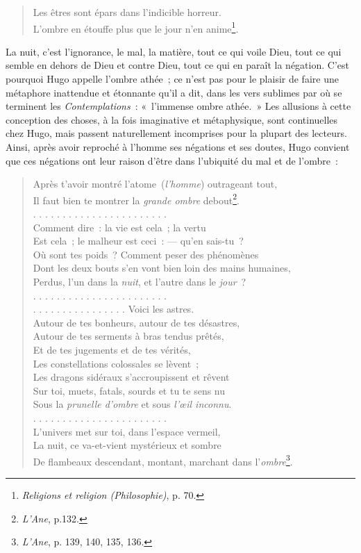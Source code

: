 \documentclass[french,twoside]{book} %
\begin{document}
\begin{verse}
Les êtres sont épars dans l’indicible horreur.\\
L’ombre en étouffe plus que le jour n’en anime\footnote{\emph{Religions et religion (Philosophie)}, p. 70.}.\\
\end{verse}

\noindent La nuit, c’est l’ignorance, le mal, la matière, tout ce qui voile Dieu, tout ce qui semble en dehors de Dieu et contre Dieu, tout ce qui en paraît la négation. C’est pourquoi Hugo appelle l’ombre athée ; ce n’est pas pour le plaisir de faire une métaphore inattendue et étonnante qu’il a dit, dans les vers sublimes par où se terminent les \emph{Contemplations} : « l’immense ombre athée. » Les allusions à cette conception des choses, à la fois imaginative et métaphysique, sont continuelles chez Hugo, mais passent naturellement incomprises pour la plupart des lecteurs. Ainsi, après avoir reproché à l’homme ses négations et ses doutes, Hugo convient que ces négations ont leur raison d’être dans l’ubiquité du mal et de l’ombre :\par


\begin{verse}
Après t’avoir montré l’atome (\emph{l’homme}) outrageant tout,\\
Il faut bien te montrer la \emph{grande ombre} debout\footnote{\emph{L’Ane}, p.132.}.\\
. . . . . . . . . . . . . . . . . . . . . . .\\
Comment dire : la vie est cela ; la vertu\\
Est cela ; le malheur est ceci : — qu’en sais-tu ?\\
Où sont tes poids ? Comment peser des phénomènes\\
Dont les deux bouts s’en vont bien loin des mains humaines,\\
Perdus, l’un dans la \emph{nuit}, et l’autre dans le \emph{jour} ?\\
. . . . . . . . . . . . . . . . . . . . . . .\\
. . . . . . . . . . . . . . . . Voici les astres.\\
Autour de tes bonheurs, autour de tes désastres,\\
Autour de tes serments à bras tendus prêtés,\\
Et de tes jugements et de tes vérités,\\
Les constellations colossales se lèvent ;\\
Les dragons sidéraux s’accroupissent et rêvent\\
Sur toi, muets, fatals, sourds et tu te sens nu\\
Sous la \emph{prunelle d’ombre} et sous \emph{l’œil inconnu}.\\
. . . . . . . . . . . . . . . . . . . . . . .\\
L’univers met sur toi, dans l’espace vermeil,\\
La nuit, ce va-et-vient mystérieux et sombre\\
De flambeaux descendant, montant, marchant dans l’\emph{ombre}\footnote{\emph{L’Ane}, p. 139, 140, 135, 136.}.\\
\end{verse}
\end{document}
